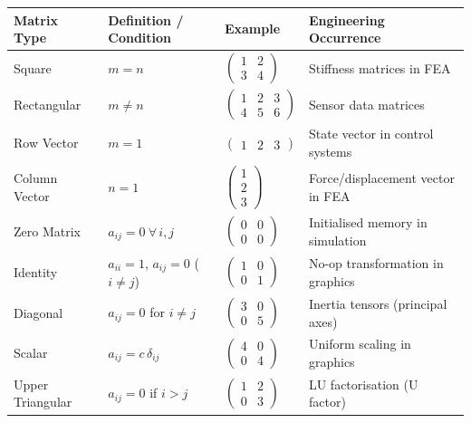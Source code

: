\documentclass[12pt,a4paper]{article}
\begin{document}
\begin{center}
\begin{tabular}{@{}p{2.8cm}p{4.2cm}p{3cm}p{4cm}@{}}
\toprule
\textbf{Matrix Type} & \textbf{Definition / Condition} & \textbf{Example} & \textbf{Engineering Occurrence} \\
\midrule
Square & $m = n$ & $\begin{pmatrix}1&2\\3&4\end{pmatrix}$ & Stiffness matrices in FEA \\
\addlinespace
Rectangular & $m \neq n$ & $\begin{pmatrix}1&2&3\\4&5&6\end{pmatrix}$ & Sensor data matrices \\
\addlinespace
Row Vector & $m = 1$ & $\begin{pmatrix}1&2&3\end{pmatrix}$ & State vector in control systems \\
\addlinespace
Column Vector & $n = 1$ & $\begin{pmatrix}1\\2\\3\end{pmatrix}$ & Force/displacement vector in FEA \\
\addlinespace
Zero Matrix & $a_{ij} = 0\ \forall\, i,j$ & $\begin{pmatrix}0&0\\0&0\end{pmatrix}$ & Initialised memory in simulation \\
\addlinespace
Identity & $a_{ii}=1$, $a_{ij}=0$ ($i\neq j$) & $\begin{pmatrix}1&0\\0&1\end{pmatrix}$ & No-op transformation in graphics \\
\addlinespace
Diagonal & $a_{ij}=0$ for $i\neq j$ & $\begin{pmatrix}3&0\\0&5\end{pmatrix}$ & Inertia tensors (principal axes) \\
\addlinespace
Scalar & $a_{ij} = c\,\delta_{ij}$ & $\begin{pmatrix}4&0\\0&4\end{pmatrix}$ & Uniform scaling in graphics \\
\addlinespace
Upper Triangular & $a_{ij}=0$ if $i > j$ & $\begin{pmatrix}1&2\\0&3\end{pmatrix}$ & LU factorisation (U factor) \\

\end{tabular}
\end{center}
\end{document}

